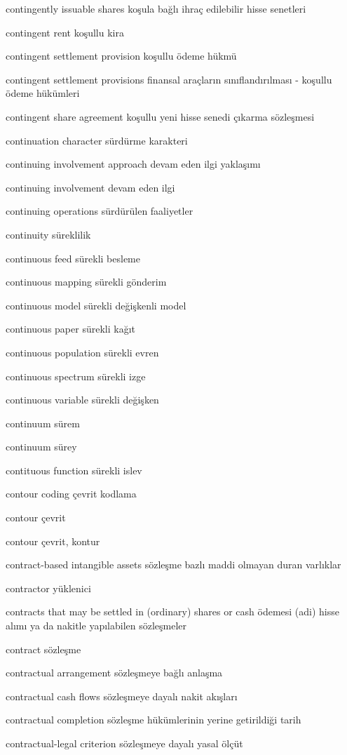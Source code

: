 \documentclass[12pt,fleqn]{article}\usepackage{../../common}
\begin{document}
contingently issuable shares koşula bağlı ihraç edilebilir hisse senetleri

contingent rent koşullu kira

contingent settlement provision koşullu ödeme hükmü

contingent settlement provisions finansal araçların sınıflandırılması - koşullu ödeme hükümleri

contingent share agreement koşullu yeni hisse senedi çıkarma sözleşmesi

continuation character sürdürme karakteri

continuing involvement approach devam eden ilgi yaklaşımı

continuing involvement devam eden ilgi

continuing operations sürdürülen faaliyetler

continuity süreklilik

continuous feed sürekli besleme

continuous mapping sürekli gönderim

continuous model sürekli değişkenli model

continuous paper sürekli kağıt

continuous population sürekli evren

continuous spectrum sürekli izge

continuous variable sürekli değişken

continuum sürem

continuum sürey

contituous function sürekli islev

contour coding çevrit kodlama

contour çevrit

contour çevrit, kontur

contract-based intangible assets sözleşme bazlı maddi olmayan duran varlıklar

contractor yüklenici

contracts that may be settled in (ordinary) shares or cash ödemesi (adi) hisse alımı ya da nakitle yapılabilen sözleşmeler

contract sözleşme

contractual arrangement sözleşmeye bağlı anlaşma

contractual cash flows sözleşmeye dayalı nakit akışları

contractual completion sözleşme hükümlerinin yerine getirildiği tarih

contractual-legal criterion sözleşmeye dayalı yasal ölçüt
\end{document}
